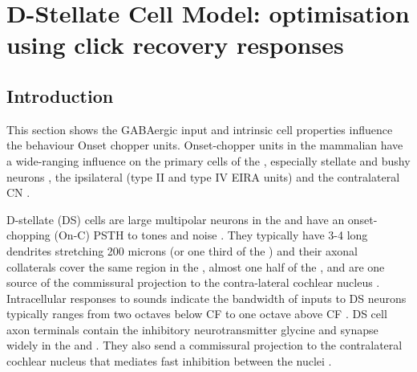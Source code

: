 
\section[DS Cell Model]{D-Stellate Cell Model: optimisation using click recovery
  responses}\label{sec:d-stellate-cell-model}

\subsection{Introduction}\label{sec:DS:introduction}

This section shows the GABAergic input and intrinsic cell properties influence
the behaviour Onset chopper units.  Onset-chopper units in the mammalian \VCN
have a wide-ranging influence on the primary cells of the \VCN, especially
stellate and bushy neurons \citep{RhodeSmithEtAl:1983}, the ipsilateral \DCN
(type II and type IV EIRA units) and the contra\-lateral CN
\citep{NeedhamPaolini:2007}.

\smallskip{}

  
D-stellate (DS) cells are large multipolar neurons in the \VCN and have an
onset-chopping (On-C) PSTH to tones and noise \citep{SmithRhode:1989,
  NeedhamPaolini:2006}.  They typically have 3-4 long dendrites stretching
200 microns (or one third of the \VCN) and their axonal collaterals cover
the same region in the \VCN, almost one half of the \DCN, and are one
source of the commissural projection to the contra-lateral cochlear nucleus
\citep{Cant:1992,Cant:1981,SchofieldCant:1996,CantBenson:2003,
  NeedhamPaolini:2007, PaoliniClark:1999}. Intracellular responses to
sounds indicate the bandwidth of inputs to DS neurons typically ranges from
two octaves below CF to one octave above CF \citep{PalmerJiangEtAl:1996,
  JiangPalmerEtAl:1996, PaoliniClark:1999}. DS cell axon terminals contain
the inhibitory neurotransmitter glycine and synapse widely in the \VCN and
\DCN\@.  They also send a commissural projection to the contralateral
cochlear nucleus that mediates fast inhibition between the nuclei
\citep{NeedhamPaolini:2003, NeedhamPaolini:2006, Oertel:1997}.

